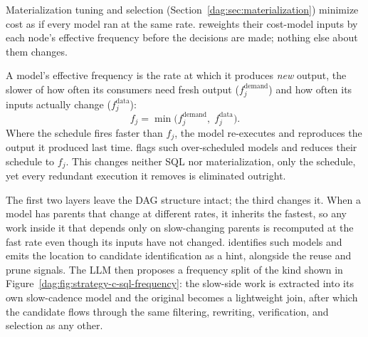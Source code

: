 Materialization tuning and selection (Section~\ref{dag:sec:materialization}) minimize cost as if every model ran at the same rate. \dagsmith{} reweights their cost-model inputs by each node's effective frequency before the decisions are made; nothing else about them changes.

A model's effective frequency is the rate at which it produces \emph{new} output, the slower of how often its consumers need fresh output ($f^{\text{demand}}_j$) and how often its inputs actually change ($f^{\text{data}}_j$):
\begin{equation*}
f_j = \min\!\big(f^{\text{demand}}_j,\; f^{\text{data}}_j\big).
\end{equation*}
Where the schedule fires faster than $f_j$, the model re-executes and reproduces the output it produced last time. \dagsmith{} flags such over-scheduled models and reduces their schedule to $f_j$. This changes neither SQL nor materialization, only the schedule, yet every redundant execution it removes is eliminated outright.

The first two layers leave the DAG structure intact; the third changes it. When a model has parents that change at different rates, it inherits the fastest, so any work inside it that depends only on slow-changing parents is recomputed at the fast rate even though its inputs have not changed. \dagsmith{} identifies such models and emits the location to candidate identification as a hint, alongside the reuse and prune signals. The LLM then proposes a frequency split of the kind shown in Figure~\ref{dag:fig:strategy-c-sql-frequency}: the slow-side work is extracted into its own slow-cadence model and the original becomes a lightweight join, after which the candidate flows through the same filtering, rewriting, verification, and selection as any other.

